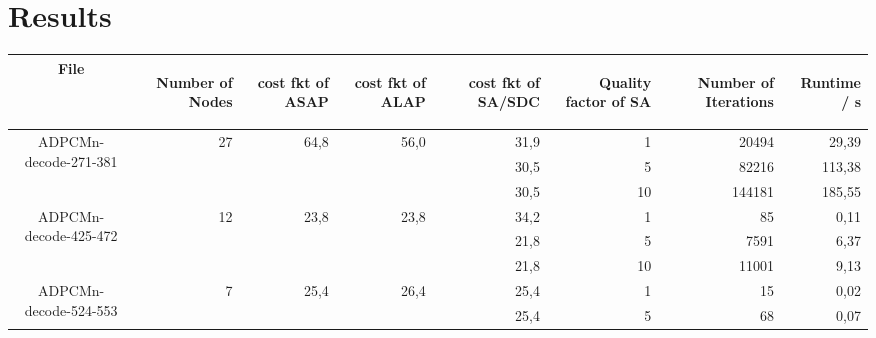 \documentclass[colorback,accentcolor=tud1c,11pt]{tudreport}
\begin{document}
  \chapter{Results}
  \vspace{100pt}
  \begin{tabular}{ c | r | r | r | r | r | r | r }
    File &
    \begin{rotate}{60} Number of Nodes \end{rotate} \hspace{3pt} &
    \begin{rotate}{60} cost fkt of ASAP \end{rotate} \hspace{10pt} &
    \begin{rotate}{60} cost fkt of ALAP \end{rotate} \hspace{10pt} &
    \begin{rotate}{60} cost fkt of SA/SDC \end{rotate} \hspace{10pt} &
    \begin{rotate}{60} Quality factor of SA \end{rotate} \hspace{3pt} &
    \begin{rotate}{60} Number of Iterations \end{rotate} \hspace{12pt} &
    \begin{rotate}{60} Runtime / s \end{rotate} \hspace{12pt} \\
   \hline
   \multirow{3}{*}{ADPCMn-decode-271-381} & \multirow{3}{*}{27} & \multirow{3}{*}{64,8} & \multirow{3}{*}{56,0} & 31,9 & 1 & 20494 & 29,39 \\
    &  &  &  & 30,5 & 5 & 82216 & 113,38 \\
    &  &  &  & 30,5 & 10 & 144181 & 185,55 \\
   \multirow{3}{*}{ADPCMn-decode-425-472} & \multirow{3}{*}{12} & \multirow{3}{*}{23,8} & \multirow{3}{*}{23,8} & 34,2 & 1 & 85 & 0,11 \\
    &  &  &  & 21,8 & 5 & 7591 & 6,37 \\
    &  &  &  & 21,8 & 10 & 11001 & 9,13 \\
   \multirow{3}{*}{ADPCMn-decode-524-553} & \multirow{3}{*}{7} & \multirow{3}{*}{25,4} & \multirow{3}{*}{26,4} & 25,4 & 1 & 15 & 0,02 \\
    &  &  &  & 25,4 & 5 & 68 & 0,07 \\

\end{tabular}
\end{document}
